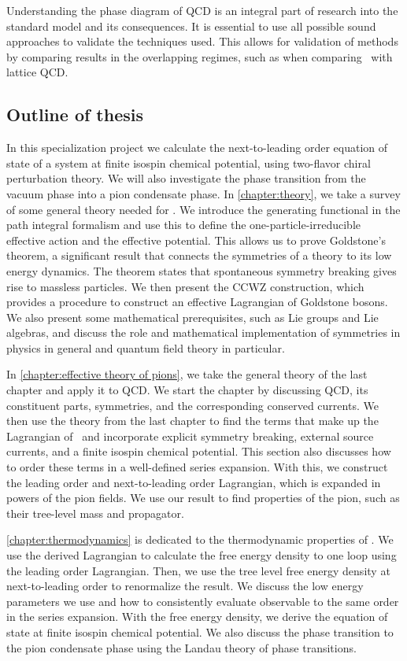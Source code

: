 Understanding the phase diagram of QCD is an integral part of research into the standard model and its consequences.
It is essential to use all possible sound approaches to validate the techniques used.
This allows for validation of methods by comparing results in the overlapping regimes, such as when comparing \chpt\ with lattice QCD.


\subsection*{Outline of thesis}
In this specialization project we calculate the next-to-leading order equation of state of a system at finite isospin chemical potential, using two-flavor chiral perturbation theory.
We will also investigate the phase transition from the vacuum phase into a pion condensate phase.
In \autoref{chapter:theory}, we take a survey of some general theory needed for \chpt.
We introduce the generating functional in the path integral formalism and use this to define the one-particle-irreducible effective action and the effective potential.
This allows us to prove Goldstone's theorem, a significant result that connects the symmetries of a theory to its low energy dynamics.
The theorem states that spontaneous symmetry breaking gives rise to massless particles.
We then present the CCWZ construction, which provides a procedure to construct an effective Lagrangian of Goldstone bosons.
We also present some mathematical prerequisites, such as Lie groups and Lie algebras, and discuss the role and mathematical implementation of symmetries in physics in general and quantum field theory in particular.

In \autoref{chapter:effective theory of pions}, we take the general theory of the last chapter and apply it to QCD.
We start the chapter by discussing QCD, its constituent parts, symmetries, and the corresponding conserved currents.
We then use the theory from the last chapter to find the terms that make up the Lagrangian of \chpt\, and incorporate explicit symmetry breaking, external source currents, and a finite isospin chemical potential.
This section also discusses how to order these terms in a well-defined series expansion.
With this, we construct the leading order and next-to-leading order Lagrangian, which is expanded in powers of the pion fields.
We use our result to find properties of the pion, such as their tree-level mass and propagator.

\autoref{chapter:thermodynamics} is dedicated to the thermodynamic properties of \chpt.
We use the derived Lagrangian to calculate the free energy density to one loop using the leading order Lagrangian.
Then, we use the tree level free energy density at next-to-leading order to renormalize the result.
We discuss the low energy parameters we use and how to consistently evaluate observable to the same order in the series expansion.
With the free energy density, we derive the equation of state at finite isospin chemical potential.
We also discuss the phase transition to the pion condensate phase using the Landau theory of phase transitions.

